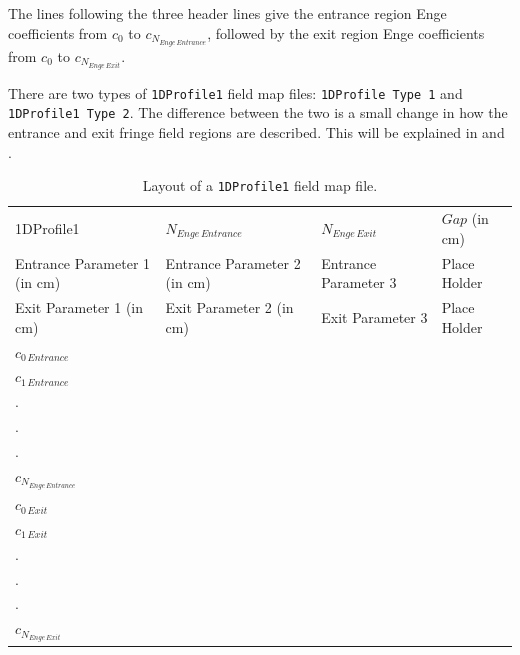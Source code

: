 The lines following the three header lines give the entrance region Enge coefficients from $c_0$ to $c_{N_{Enge\,Entrance}}$, followed
by the exit region Enge coefficients from $c_0$ to $c_{N_{Enge\,Exit}}$.

There are two types of \texttt{1DProfile1} field map files: \texttt{1DProfile Type 1} and \texttt{1DProfile1 Type 2}. The difference
between the two is a small change in how the entrance and exit fringe field regions are described. This will be explained in
 and .

\begin{table}[ht!]
    \caption{Layout of a \texttt{1DProfile1} field map file.}
    \label{tab:1DProfile1}
    \begin{center}
    \begin{tabular}{llll}
      \hline
      1DProfile1 & $N_{Enge\,Entrance}$ & $N_{Enge\,Exit}$ & $Gap$ (in cm)\\
      Entrance Parameter 1 (in cm) & Entrance Parameter 2 (in cm) & Entrance Parameter 3 & Place Holder\\
      Exit Parameter 1 (in cm) & Exit Parameter 2 (in cm) & Exit Parameter 3 & Place Holder\\
      $c_{0\, Entrance}$ & & & \\
      $c_{1\, Entrance}$ & & & \\
      . & & & \\
      . & & & \\
      . & & & \\
      $c_{N_{Enge\,Entrance}}$ & & & \\
      $c_{0\,Exit}$ & & & \\
      $c_{1\,Exit}$ & & & \\
      . & & & \\
      . & & & \\
      . & & & \\
      $c_{N_{Enge\,Exit}}$ & & & \\
      \hline
    \end{tabular}
    \end{center}
\end{table}


